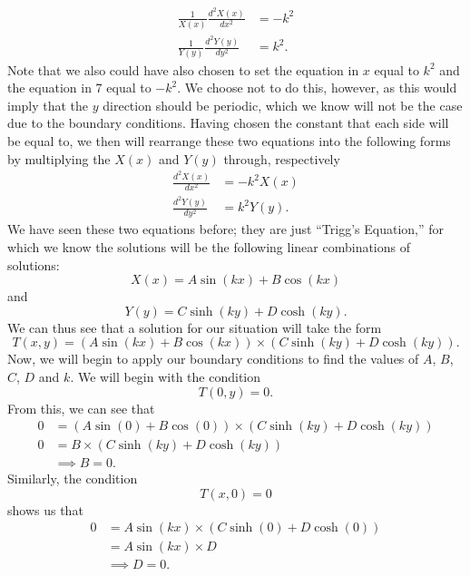 \documentclass[11pt]{report}
\newcommand{\fpar}[1]{\left({#1}\right)}
\begin{document}
    \begin{align*}
        \frac{1}{X(x)}\frac{d^2X(x)}{dx^2} &= -k^2\\
        \frac{1}{Y(y)}\frac{d^2Y(y)}{dy^2} &= k^2.
    \end{align*}
Note that we also could have also chosen to set the equation in $x$ equal to $k^2$ and the equation in 7 equal to $-k^2$. We choose not to do this, however, as this would imply that the $y$ direction should be periodic, which we know will not be the case due to the boundary conditions. Having chosen the constant that each side will be equal to, we then will rearrange these two equations into the following forms by multiplying the $X(x)$ and $Y(y)$ through, respectively
    \begin{align*}
        \frac{d^2X(x)}{dx^2} &= -k^2X(x)\\
        \frac{d^2Y(y)}{dy^2} &= k^2Y(y).
    \end{align*}
We have seen these two equations before; they are just ``Trigg's Equation,'' for which we know the solutions will be the following linear combinations of solutions:
    \begin{equation*}
        X(x) = A\sin\fpar{kx}+B\cos\fpar{kx}
    \end{equation*}
and
    \begin{equation*}
        Y(y) = C\sinh\fpar{ky}+D\cosh\fpar{ky}.
    \end{equation*}
We can thus see that a solution for our situation will take the form
    \begin{equation*}
        T(x,y) = \fpar{A\sin\fpar{kx}+B\cos\fpar{kx}}\times\fpar{C\sinh\fpar{ky}+D\cosh\fpar{ky}}.
    \end{equation*}
Now, we will begin to apply our boundary conditions to find the values of $A$, $B$, $C$, $D$ and $k$. We will begin with the condition
    \[T(0,y)=0.\]
From this, we can see that
    \begin{align*}
        0 &= \fpar{A\sin\fpar{0}+B\cos\fpar{0}}\times\fpar{C\sinh\fpar{ky}+D\cosh\fpar{ky}}\\
        0 &= B\times\fpar{C\sinh\fpar{ky}+D\cosh\fpar{ky}}\\
        &\implies
        B = 0.
    \end{align*}
Similarly, the condition
    \[T(x,0)=0\]
shows us that
    \begin{align*}
        0 &= A\sin\fpar{kx}\times\fpar{C\sinh\fpar{0}+D\cosh\fpar{0}}\\
        &= A\sin\fpar{kx}\times D\\
        &\implies D = 0.
    \end{align*}
\end{document}
